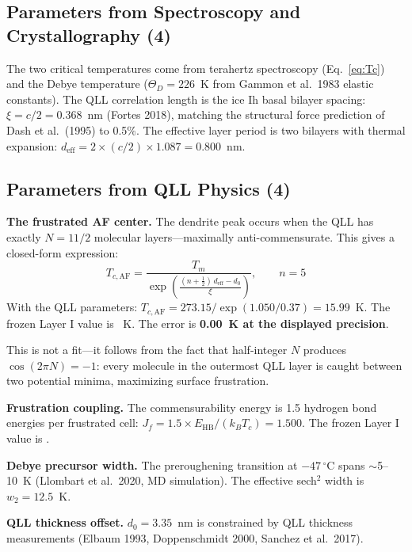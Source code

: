 \documentclass[12pt,letterpaper]{article}
\begin{document}
\subsection{Parameters from Spectroscopy and Crystallography (4)}

The two critical temperatures come from terahertz spectroscopy (Eq.~\eqref{eq:Tc}) and the Debye temperature ($\Theta_D = 226$~K from Gammon et al.\ 1983 elastic constants).  The QLL correlation length is the ice Ih basal bilayer spacing: $\xi = c/2 = 0.368$~nm (Fortes 2018), matching the structural force prediction of Dash et al.\ (1995) to 0.5\%.  The effective layer period is two bilayers with thermal expansion: $d_{\mathrm{eff}} = 2 \times (c/2) \times 1.087 = 0.800$~nm.

\subsection{Parameters from QLL Physics (4)}

\textbf{The frustrated AF center.}  The dendrite peak occurs when the QLL has exactly $N = 11/2$ molecular layers---maximally anti-commensurate.  This gives a closed-form expression:
\begin{equation}
\boxed{T_{c,\mathrm{AF}} = \frac{T_m}{\exp\!\left(\frac{(n+\tfrac{1}{2})\,d_{\mathrm{eff}} - d_0}{\xi}\right)}, \qquad n = 5}
\label{eq:TcAF}
\end{equation}
With the QLL parameters: $T_{c,\mathrm{AF}} = 273.15 / \exp(1.050/0.37) = 15.99$~K.  The frozen Layer I value is \SnowParamTcAF~K.  The error is \textbf{0.00~K at the displayed precision}.

This is not a fit---it follows from the fact that half-integer $N$ produces $\cos(2\pi N) = -1$: every molecule in the outermost QLL layer is caught between two potential minima, maximizing surface frustration.

\textbf{Frustration coupling.}  The commensurability energy is 1.5 hydrogen bond energies per frustrated cell: $J_f = 1.5 \times E_{\mathrm{HB}}/(k_B T_c) = 1.500$.  The frozen Layer I value is \SnowParamJf.

\textbf{Debye precursor width.}  The preroughening transition at $-47\,{}^\circ$C spans $\sim$5--10~K (Llombart et al.\ 2020, MD simulation).  The effective sech$^2$ width is $w_2 = 12.5$~K.

\textbf{QLL thickness offset.}  $d_0 = 3.35$~nm is constrained by QLL thickness measurements (Elbaum 1993, Doppenschmidt 2000, Sanchez et al.\ 2017).
\end{document}
